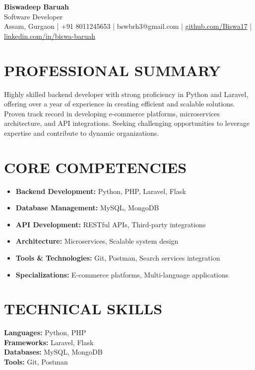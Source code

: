 \documentclass[10pt,a4paper]{article}
\begin{document}
\pagestyle{empty}

\begin{center}
    {\Huge \textbf{Biswadeep Baruah}} \\
    \vspace{1mm}
    {\Large Software Developer} \\
    \vspace{2mm}
    Assam, Gurgaon | +91 8011245653 | bswbrh3@gmail.com | \href{https://github.com/Biswa17}{github.com/Biswa17} | \href{https://linkedin.com/in/biswa-baruah}{linkedin.com/in/biswa-baruah}
\end{center}

\section*{PROFESSIONAL SUMMARY}
Highly skilled backend developer with strong proficiency in Python and Laravel, offering over a year of experience in creating efficient and scalable solutions. Proven track record in developing e-commerce platforms, microservices architecture, and API integrations. Seeking challenging opportunities to leverage expertise and contribute to dynamic organizations.

\section*{CORE COMPETENCIES}
\begin{itemize}[leftmargin=*, itemsep=0pt, topsep=0pt, parsep=0pt]
    \item \textbf{Backend Development:} Python, PHP, Laravel, Flask
    \item \textbf{Database Management:} MySQL, MongoDB
    \item \textbf{API Development:} RESTful APIs, Third-party integrations
    \item \textbf{Architecture:} Microservices, Scalable system design
    \item \textbf{Tools \& Technologies:} Git, Postman, Search services integration
    \item \textbf{Specializations:} E-commerce platforms, Multi-language applications
\end{itemize}

\section*{TECHNICAL SKILLS}
\textbf{Languages:} Python, PHP \\
\textbf{Frameworks:} Laravel, Flask \\
\textbf{Databases:} MySQL, MongoDB \\
\textbf{Tools:} Git, Postman
\end{document}

